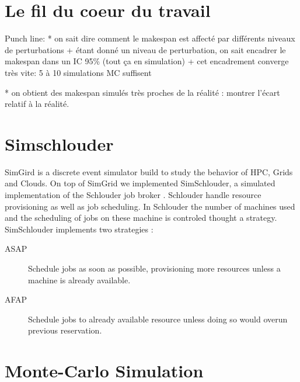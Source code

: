 \documentclass[10pt,conference,compsocconf]{IEEEtran}
\begin{document}
\section{Le fil du coeur du travail}
Punch line:
*  on sait dire comment le makespan est affecté par différents niveaux de
perturbations 
    + étant donné un niveau de perturbation, on sait encadrer le
      makespan dans un IC 95\% (tout ça en simulation)
    + cet encadrement converge très vite: 5 à 10 simulations MC suffisent

* on obtient des makespan simulés très proches de la réalité : montrer l'écart
relatif à la réalité. 
\section{Simschlouder}

SimGird\cite{simgrid} is a discrete event simulator build to study the behavior
of HPC, Grids and Clouds. On top of SimGrid we implemented SimSchlouder, a
simulated implementation of the Schlouder job broker \cite{Michon17}. Schlouder
handle resource provisioning as well as job scheduling. In Schlouder the number
of machines used and the scheduling of jobs on these machine is controled
thought a strategy. SimSchlouder implements two strategies : 
\begin{description}
\item [ASAP] Schedule jobs as soon as possible, provisioning more resources
	unless a machine is already available.
\item [AFAP] Schedule jobs to already available resource unless doing so would
	overun previous reservation.
\end{description}

\section{Monte-Carlo Simulation}
\end{document}
